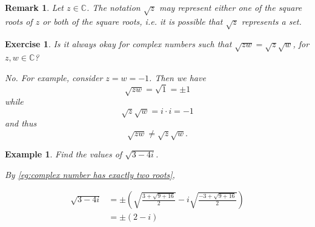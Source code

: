 \documentclass[11pt, oneside]{book}
\theoremstyle{break}
\newtheorem*{remark}{Remark}
\newtheorem{ex}{Exercise}[section]
\newtheorem{eg}{Example}[section]
\begin{document}
\begin{remark}
	Let $z \in \mathbb{C}$. The notation $\sqrt{z}$ may represent either one of the square roots of $z$ or both of the square roots, i.e. it is possible that $\sqrt{z}$ represents a set.
\end{remark}

\begin{ex}\label{ex:Separation of Multiplication in Square Roots}
	Is it always okay for complex numbers such that $\sqrt{zw} = \sqrt{z} \sqrt{w}$, for $z, w \in \mathbb{C}$?

	No. For example, consider $z = w = -1$. Then we have
	\begin{equation*}
		\sqrt{zw} = \sqrt{1} = \pm 1
	\end{equation*}
	while
	\begin{equation*}
		\sqrt{z} \sqrt{w} = i \cdot i = -1
	\end{equation*}
	and thus
	\begin{equation*}
		\sqrt{zw} \neq \sqrt{z} \sqrt{w}.
	\end{equation*}
\end{ex}

\begin{eg}
	Find the values of $\sqrt{3 - 4i}$.

	By \cref{eg:complex number has exactly two roots},

	\begin{align*}
		\sqrt{3 - 4i} &= \pm \left( \sqrt{\frac{3 + \sqrt{9 + 16}}{2}} - i \sqrt{\frac{-3 + \sqrt{9 + 16}}{2}} \right) \\
			&= \pm (2 - i)
	\end{align*}
\end{eg}
\end{document}

